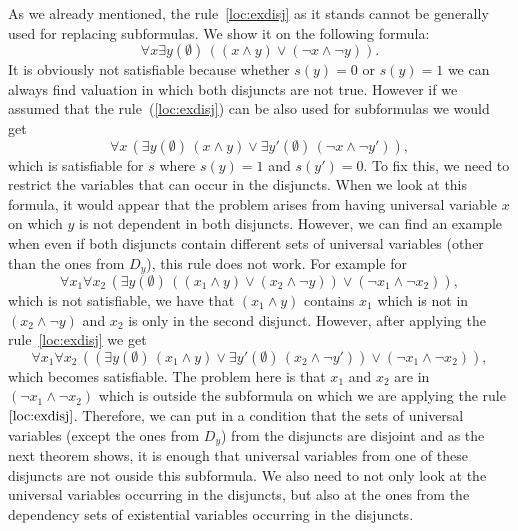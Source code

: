 \documentclass[
  digital, %
  color,
  twoside, %
  table,   %
  nolof,     %
  nolot,     %
]{fithesis3}
\theoremstyle{definition}
\theoremstyle{remark}
\newcommand{\itholds}{\,}
\begin{document}
As we already mentioned, the rule~\eqref{loc:exdisj} as it stands cannot be generally used for replacing subformulas. We show it on the following formula:
\[\forall x \exists y(\emptyset) \itholds ((x \land y) \lor (\neg x \land \neg y)).\]
It is obviously not satisfiable because whether $s(y) = 0$ or $s(y) = 1$ we can always find valuation in which both disjuncts are not true. However if we assumed that the rule~(\ref{loc:exdisj}) can be also used for subformulas we would get
\[\forall x \itholds (\exists y(\emptyset) \itholds (x \land y) \lor \exists y'(\emptyset) \itholds (\neg x \land \neg y')),\]
which is satisfiable for $s$ where $s(y) = 1$ and $s(y') = 0$. To fix this, we need to restrict the variables that can occur in the disjuncts. When we look at this formula, it would appear that the problem arises from having universal variable $x$ on which $y$ is not dependent in both disjuncts. However, we can find an example when even if both disjuncts contain different sets of universal variables (other than the ones from $D_y$), this rule does not work. For example for
\[\forall x_1 \forall x_2 \itholds (\exists y(\emptyset) \itholds ((x_1 \land y) \lor (x_2 \land \neg y)) \lor (\neg x_1 \land \neg x_2)),\]
which is not satisfiable, we have that $(x_1 \land y)$ contains $x_1$ which is not in $(x_2 \land \neg y)$ and $x_2$ is only in the second disjunct. However, after applying the rule~\eqref{loc:exdisj} we get
\[\forall x_1 \forall x_2 \itholds ((\exists y(\emptyset) \itholds (x_1 \land y) \lor \exists y'(\emptyset) \itholds (x_2 \land \neg y')) \lor (\neg x_1 \land \neg x_2)),\]
which becomes satisfiable. The problem here is that $x_1$ and $x_2$ are in $(\neg x_1 \land \neg x_2)$ which is outside the subformula on which we are applying the rule $\eqref{loc:exdisj}$. Therefore, we can put in a condition that the sets of universal variables (except the ones from $D_y$) from the disjuncts are disjoint and as the next theorem shows, it is enough that universal variables from one of these disjuncts are not ouside this subformula. We also need to not only look at the universal variables occurring in the disjuncts, but also at the ones from the dependency sets of existential variables occurring in the disjuncts.
\end{document}
